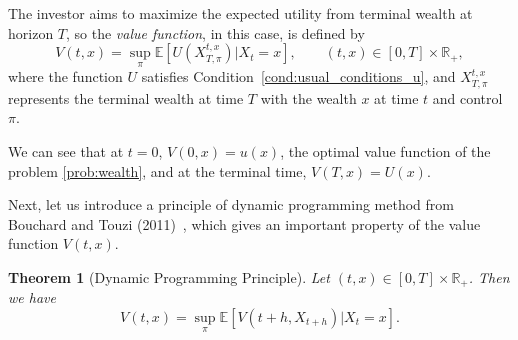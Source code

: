 \documentclass[a4paper]{article}
\newtheorem{theorem}{Theorem}[section]
\theoremstyle{definition}
\numberwithin{equation}{section}
\begin{document}
The investor aims to maximize the expected utility from terminal wealth at horizon $T$, so the \emph{value function}, in this case, is defined by
$$V(t,x)=\sup_\pi\mathbb E[U(X^{t,x}_{T,\pi})\lvert X_t=x],\qquad (t,x)\in[0,T]\times\mathbb R_+,$$
where the function $U$ satisfies Condition~\ref{cond:usual_conditions_u}, and $X^{t,x}_{T,\pi}$ represents the terminal wealth at time $T$ with the wealth $x$ at time $t$ and control $\pi$.

We can see that at $t=0$, $V(0,x)=u(x)$, the optimal value function of the problem \eqref{prob:wealth}, and at the terminal time, $V(T,x)=U(x)$.

Next, let us introduce a principle of dynamic programming method from Bouchard and Touzi (2011)~\cite{dpp}, which gives an important property of the value function $V(t,x)$. 
\begin{theorem}[Dynamic Programming Principle]
Let $(t,x)\in[0,T]\times\mathbb R_+$. Then we have
$$V(t,x)=\sup_\pi\mathbb E[V(t+h,X_{t+h})\lvert X_t=x].$$
\end{theorem}
\end{document}
